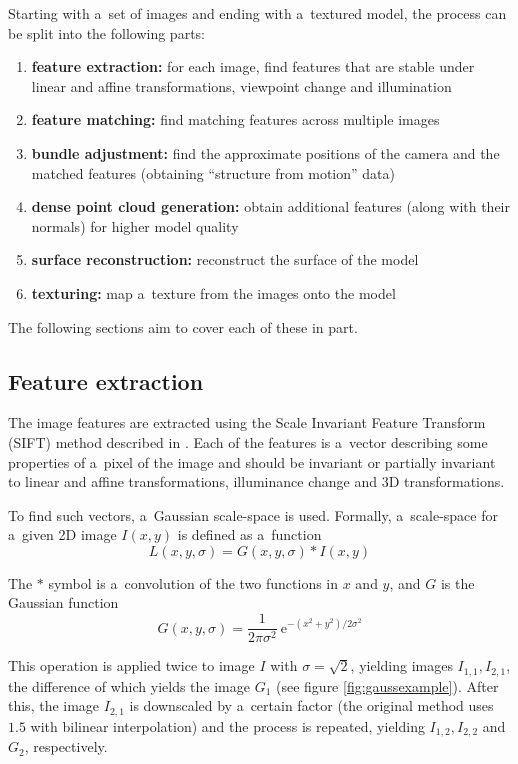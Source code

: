 Starting with a~set of images and ending with a~textured model, the process can be split into the following parts:

\begin{enumerate}
	\item \textbf{feature extraction:} for each image, find features that are stable under linear and affine transformations, viewpoint change and illumination
	\item \textbf{feature matching:} find matching features across multiple images
	\item \textbf{bundle adjustment:} find the approximate positions of the camera and the matched features (obtaining ``structure from motion'' data)
	\item \textbf{dense point cloud generation:} obtain additional features (along with their normals) for higher model quality
	\item \textbf{surface reconstruction:} reconstruct the surface of the model
	\item \textbf{texturing:} map a~texture from the images onto the model
\end{enumerate}

The following sections aim to cover each of these in part.

\subsection{Feature extraction} \label{ch:fext}
The image features are extracted using the Scale Invariant Feature Transform (SIFT) method described in \citet{lowe1999object,lowe2004distinctive}.
Each of the features is a~vector describing some properties of a~pixel of the image and should be invariant or partially invariant to linear and affine transformations, illuminance change and 3D transformations.

To find such vectors, a~Gaussian scale-space is used.
Formally, a~scale-space for a~given 2D image $I(x, y)$ is defined as a~function
\begin{equation} L(x, y, \sigma) = G(x, y, \sigma) * I(x, y) \end{equation}

The $*$ symbol is a~convolution of the two functions in $x$ and $y$, and $G$ is the Gaussian function
\begin{equation}G(x, y, \sigma) = \frac{1}{2\pi \sigma^2}\ \mathrm{e}^{-(x^2 + y^2) / 2\sigma^2}\end{equation}

This operation is applied twice to image $I$ with $\sigma = \sqrt{2}$, yielding images $I_{1,1}, I_{2,1}$, the difference of which yields the image $G_1$ (see figure \ref{fig:gaussexample}).
After this, the image $I_{2,1}$ is downscaled by a~certain factor (the original method uses $1.5$ with bilinear interpolation) and the process is repeated, yielding $I_{1,2}, I_{2,2}$ and $G_2$, respectively.


